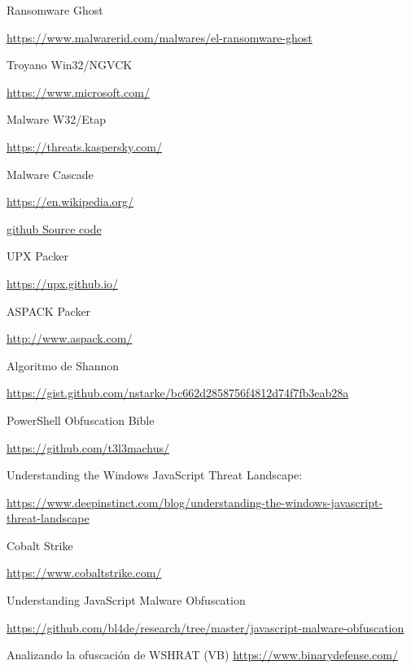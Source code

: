 \documentclass[15pt]{article}
\begin{document}
\begin{thebibliography}{40}
		Ransomware Ghost
		
		\href{https://www.malwarerid.com/malwares/el-ransomware-ghost}{https://www.malwarerid.com/malwares/el-ransomware-ghost}
		
		Troyano Win32/NGVCK
		
		\href{https://www.microsoft.com/en-us/wdsi/threats/malware-encyclopedia-description?Name=Trojan:Win32/Ngvck!mclg&threatId=-2147180992}{https://www.microsoft.com/}
		
		Malware W32/Etap
		
		\href{https://threats.kaspersky.com/mx/threat/Virus.Win32.Etap/}{https://threats.kaspersky.com/}
		
		Malware Cascade
		
		\href{https://en.wikipedia.org/wiki/Cascade_(computer_virus)}{https://en.wikipedia.org/}
		
		\href{https://gist.github.com/RC1140/5183430}{github Source code}
		
		UPX Packer
		
		\href{https://upx.github.io/}{https://upx.github.io/}
		
		ASPACK Packer
		
		\href{http://www.aspack.com/}{http://www.aspack.com/}
		
		Algoritmo de Shannon
		
		\href{https://gist.github.com/nstarke/bc662d2858756f4812d74f7fb3eab28a}{https://gist.github.com/nstarke/bc662d2858756f4812d74f7fb3eab28a}
		
		PowerShell Obfuscation Bible
		
		\href{https://github.com/t3l3machus/PowerShell-Obfuscation-Bible#Randomize-Char-Cases}{https://github.com/t3l3machus/}
		
		Understanding the Windows JavaScript Threat Landscape:
		
		\href{https://www.deepinstinct.com/blog/understanding-the-windows-javascript-threat-landscape}{https://www.deepinstinct.com/blog/understanding-the-windows-javascript-threat-landscape}
		
		Cobalt Strike
		
		\href{https://www.cobaltstrike.com/}{https://www.cobaltstrike.com/}
		
		Understanding JavaScript Malware Obfuscation
		
		\href{https://github.com/bl4de/research/blob/master/javascript-malware-obfuscation/Simple_JavaScript_malware_code_obfuscation_examples.md}{https://github.com/bl4de/research/tree/master/javascript-malware-obfuscation}
		
		Analizando la ofuscación de WSHRAT (VB)
		\href{https://www.binarydefense.com/resources/blog/revenge-is-a-dish-best-served-obfuscated/}{https://www.binarydefense.com/}
				
		
	\end{thebibliography}
\end{document}
